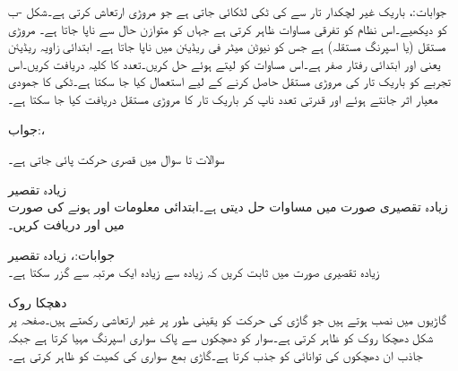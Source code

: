جوابات:، 
باریک غیر لچکدار تار سے    کی ٹکی لٹکائی جاتی ہے جو مروڑی ارتعاش کرتی ہے۔شکل -ب کو دیکھیے۔اس نظام کو  تفرقی مساوات ظاہر کرتی ہے جہاں  کو  متوازن حال سے ناپا جاتا ہے۔  مروڑی مستقل (یا اسپرنگ مستقلہ) ہے جس کو  نیوٹن میٹر فی ریڈیئن میں ناپا جاتا ہے۔ ابتدائی زاویہ  ریڈیئن یعنی  اور ابتدائی رفتار صفر ہے۔اس مساوات کو  لیتے ہوئے  حل کریں۔تعدد کا کلیہ دریافت کریں۔اس تجربے کو باریک تار کی مروڑی مستقل  حاصل کرنے کے لیے استعمال کیا جا سکتا  ہے۔ٹکی کا جمودی معیار اثر جانتے ہوئے اور قدرتی تعدد ناپ کر باریک تار کا مروڑی مستقل  دریافت کیا جا سکتا ہے۔ 

جواب:، 

سوالات  تا سوال  میں قصری حرکت پائی جاتی ہے۔

\quad زیادہ تقصیر\\
زیادہ تقصیری صورت میں مساوات  حل دیتی ہے۔ابتدائی معلومات  اور  ہونے کی صورت میں  اور  دریافت کریں۔

جوابات:،
\quad زیادہ تقصیر\\
زیادہ تقصیری صورت میں ثابت کریں کہ  زیادہ سے زیادہ ایک مرتبہ  سے گزر سکتا ہے۔

\quad دھچکا روک\\
گاڑیوں میں  نصب ہوتے ہیں جو گاڑی کی حرکت کو یقینی طور پر غیر ارتعاشی رکھتے ہیں۔صفحہ  پر شکل  دھچکا روک کو ظاہر کرتی ہے۔سوار کو دھچکوں سے پاک سواری اسپرنگ مہیا کرتا ہے جبکہ جاذب ان دھچکوں کی توانائی کو جذب کرتا ہے۔گاڑی بمع سواری کی کمیت کو  ظاہر کرتی ہے۔

